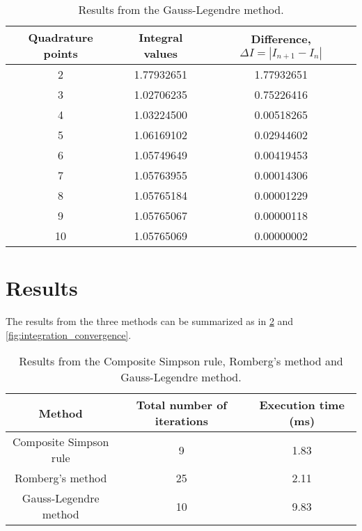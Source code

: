 \begin{table}[htb]
    \caption{Results from the Gauss-Legendre method.}
    \label{tab:results_grauss_legendre}
    \centering
    \begin{tabular}{@{}c c c@{}}
        \toprule
        Quadrature points & Integral values & Difference, $\Delta I = \left| I_{n+1} - I_{n} \right|$ \\
        \midrule

         2 &     1.77932651 &     1.77932651 \\
         3 &     1.02706235 &     0.75226416 \\
         4 &     1.03224500 &     0.00518265 \\
         5 &     1.06169102 &     0.02944602 \\
         6 &     1.05749649 &     0.00419453 \\
         7 &     1.05763955 &     0.00014306 \\
         8 &     1.05765184 &     0.00001229 \\
         9 &     1.05765067 &     0.00000118 \\
        10 &     1.05765069 &     0.00000002 \\

        \bottomrule
    \end{tabular}
\end{table}

\section{Results}

The results from the three methods can be summarized as in
\cref{tab:results_numerical_integration} and \cref{fig:integration_convergence}.

\begin{table}[htb]
    \caption{Results from the Composite Simpson rule, Romberg's method and
    Gauss-Legendre method.}
    \label{tab:results_numerical_integration}
    \centering
    \begin{tabular}{@{}c c c@{}}
        \toprule
        Method & Total number of iterations & Execution time (ms) \\
        \midrule

        Composite Simpson rule & 9  & 1.83 \\
        Romberg's method       & 25 & 2.11 \\
        Gauss-Legendre method  & 10  & 9.83 \\

        \bottomrule
    \end{tabular}
\end{table}

